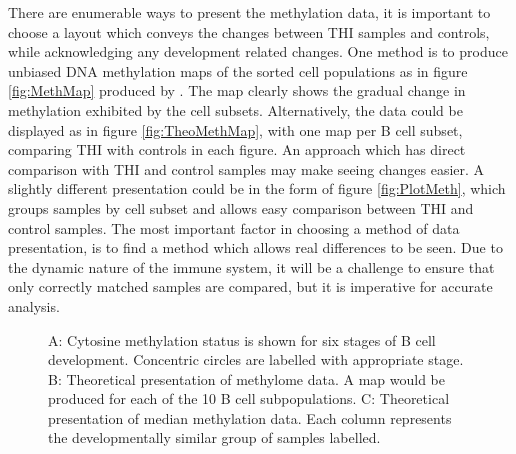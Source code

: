 \documentclass[12pt]{article}
\begin{document}
			There are enumerable ways to present the methylation data, it is important to choose a layout which conveys the changes between THI samples and controls, while acknowledging any development related changes.
			One method is to produce unbiased DNA methylation maps of the sorted cell populations as in figure \ref{fig:MethMap} produced by \citet{Kulis15}. 
			The map clearly shows the gradual change in methylation exhibited by the cell subsets. 
			Alternatively, the data could be displayed as in figure \ref{fig:TheoMethMap}, with one map per B cell subset, comparing THI with controls in each figure. 
			An approach which has direct comparison with THI and control samples may make seeing changes easier. 
			A slightly different presentation could be in the form of figure \ref{fig:PlotMeth}, which groups samples by cell subset and allows easy comparison between THI and control samples.
			The most important factor in choosing a method of data presentation, is to find a method which allows real differences to be seen. 
			Due to the dynamic nature of the immune system, it will be a challenge to ensure that only correctly matched samples are compared, but it is imperative for accurate analysis. 
			
			\begin{figure}[tb]
				\centering
				\caption{A: Cytosine methylation status is shown for six stages of B cell development. Concentric circles are labelled with appropriate stage. B: Theoretical presentation of methylome data. A map would be produced for each of the 10 B cell subpopulations. C: Theoretical presentation of median methylation data. Each column represents the developmentally similar group of samples labelled.}
			\end{figure}
			
			
			
\end{document}
